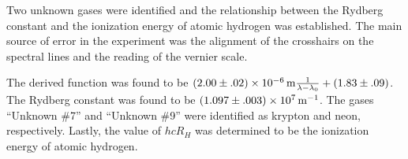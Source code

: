 \begin{paper}
Two unknown gases were identified and the relationship between the Rydberg constant and the ionization energy of atomic hydrogen was established.
The main source of error in the experiment was the alignment of the crosshairs on the spectral lines and the reading of the vernier scale.

The derived function was found to be $(2.00\pm.02)\times\SI{E-6}{\meter}\frac{1}{\lambda-\lambda_0}+(1.83\pm.09)$.
The Rydberg constant was found to be $(1.097\pm.003)\times\SI{E7}{\per\meter}$.
The gases ``Unknown \#7'' and ``Unknown \#9'' were identified as krypton and neon, respectively.
Lastly, the value of $hcR_H$ was determined to be the ionization energy of atomic hydrogen.


\end{paper}
